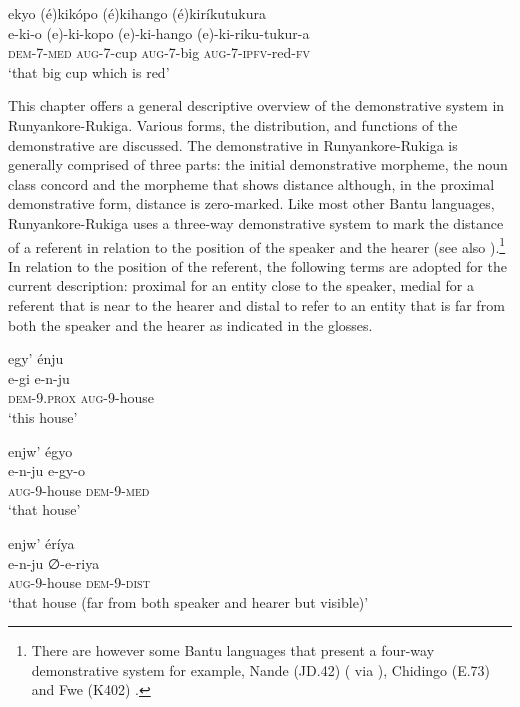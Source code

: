 \documentclass[output=paper 		  ]{langscibook}
\begin{document}
\ea%
    \label{ex:asiimwe:1}
    ekyo (é)kikópo (é)kihango (é)kiríkutukura\\
    \gll  e-ki-o  (e)-ki-kopo  (e)-ki-hango  (e)-ki-riku-tukur-a\\
  \textsc{dem}{}-7-\textsc{med}  \textsc{aug-}7-cup  \textsc{aug}{}-7-big  \textsc{aug}{}-7-\textsc{ipfv}{}-red-\textsc{fv} \\
  \glt ‘that big cup which is red’
\z

This chapter offers a general descriptive overview of the demonstrative system in Run\-yan\-ko\-re-Ru\-ki\-ga. Various forms, the distribution, and functions of the demonstrative are discussed. The demonstrative in Run\-yan\-ko\-re-Ru\-ki\-ga is generally comprised of three parts: the initial demonstrative morpheme, the noun class concord and the morpheme that shows distance although, in the proximal demonstrative form, distance is zero-marked. Like most other Bantu languages, Run\-yan\-ko\-re-Ru\-ki\-ga uses a three-way demonstrative system to mark the distance of a referent in relation to the position of the speaker and the hearer (see also ).\footnote{There are however some Bantu languages that present a four-way demonstrative system for example, Nande (JD.42) (\citealt{Valinande1984} via \citealt{VandeVelde2019}), Chidingo (E.73) \citep{Nicolle2007} and Fwe (K402) \citep{Gunnink2018}.} In relation to the position of the referent, the following terms are adopted for the current description: proximal for an entity close to the speaker, medial for a referent that is near to the hearer and distal to refer to an entity that is far from both the speaker and the hearer  as indicated in the glosses.

\ea%
    \label{ex:asiimwe:2}
    \ea\label{ex:asiimwe:2a}  egy’  énju\\
    \gll e-gi  e-n-ju\\
    \textsc{dem-9.prox}  \textsc{aug}{}-9-house\\
    \glt  ‘this house’

    \ex\label{ex:asiimwe:2b} enjw’ égyo\\
    \gll e-n-ju  e-gy-o\\
    \textsc{aug-}9-house  \textsc{dem-9-med}\\
    \glt ‘that house’

    \ex\label{ex:asiimwe:2c} enjw’ éríya\\
    \gll e-n-ju  ∅-e-riya\\
    \textsc{aug}{}-9-house  \textsc{dem}{}-9-\textsc{dist}\\
    \glt ‘that house (far from both speaker and hearer but visible)’
    \z
\z
\end{document}
